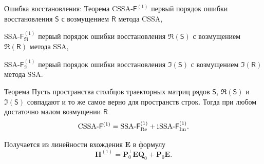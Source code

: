 \documentclass[ucs, notheorems, handout]{beamer}
\newcommand{\tX}[1]{\mathsf{#1}}
\newcommand{\iu}{\mathrm{i}\mkern1mu}
\begin{document}
\begin{frame}{Ошибка восстановления: Теорема}
    CSSA-$\tX{F}^{(1)}$ первый порядок ошибки восстановления $\tX{S}$ с возмущением $\tX{R}$ метода CSSA,

    SSA-$\tX{F}^{(1)}_{\Re}$ первый порядок ошибки восстановления $\Re(\tX{S})$ с возмущением $\Re(\tX{R})$ метода SSA,

    SSA-$\tX{F}^{(1)}_{\Im}$ первый порядок ошибки восстановления $\Im(\tX{S})$ с возмущением $\Im(\tX{R})$ метода SSA.

    \begin{block}{Теорема \label{th:sum}}
        Пусть пространства столбцов траекторных матриц рядов $\tX{S}$, $\Re(\tX{S})$ и $\Im(\tX{S})$ совпадают и то же самое верно для пространств строк.
    Тогда при любом достаточно малом возмущении $\tX{R}$
    $$\text{CSSA-}\tX{F}^{(1)} = \text{SSA-}\tX{F}^{(1)}_{\Re} + \iu\text{SSA-}\tX{F}^{(1)}_{\Im}.$$
    \end{block}
    Получается из линейности вхождения $\mathbf{E}$ в формулу
    $$\mathbf{H}^{(1)} = \mathbf{P}^{\perp}_0 \mathbf{E} \mathbf{Q}_0 + \mathbf{P}_0 \mathbf{E}.$$
    
\end{frame}
\end{document}
